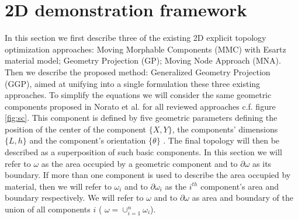 \section{2D demonstration framework}
\label{Sec3.1}
In this section we first describe three of the existing 2D explicit topology optimization approaches: Moving Morphable Components (MMC) with Esartz material model; Geometry Projection (GP); Moving Node Approach (MNA). Then we describe the proposed method: Generalized Geometry Projection (GGP), aimed at unifying into a single formulation these three existing approaches. 
To simplify the equations we will consider the same geometric components proposed in Norato et al. \cite{norato2015geometry} for all reviewed approaches c.f. figure \ref{fig:sc}. This component is defined by five geometric parameters defining the position of the center of the component $\lbrace X,Y\rbrace$, the components' dimensions $\lbrace L,h \rbrace$  and the component's orientation $\lbrace \theta \rbrace$ . The final topology will then be described as a superposition of such basic components. 
In this section we will refer to $\omega$ as the area occupied by a geometric component and to $\partial \omega$ as its boundary. If more than one component is used to describe the area occupied by material, then we will refer to $\omega_i$ and to $\partial \omega_i$ as the $i^{th}$ component's area and boundary respectively. We will refer to $\omega$ and to $\partial \omega$ as area and boundary of the union of all components $i$ ( $\omega=\cup_{i=1}^n{\omega_i}$). 

